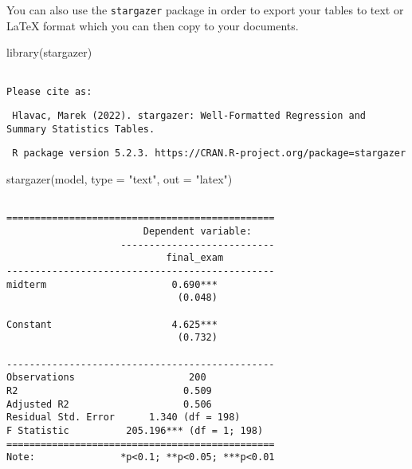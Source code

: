 \documentclass[
  letterpaper,
  DIV=11,
  numbers=noendperiod]{scrreprt}
\newenvironment{Shaded}{\begin{snugshade}}{\end{snugshade}}
\newcommand{\AttributeTok}[1]{\textcolor[rgb]{0.40,0.45,0.13}{#1}}
\newcommand{\FunctionTok}[1]{\textcolor[rgb]{0.28,0.35,0.67}{#1}}
\newcommand{\NormalTok}[1]{\textcolor[rgb]{0.00,0.23,0.31}{#1}}
\newcommand{\StringTok}[1]{\textcolor[rgb]{0.13,0.47,0.30}{#1}}
\begin{document}
You can also use the \texttt{stargazer} package in order to export your
tables to text or LaTeX format which you can then copy to your
documents.

\begin{Shaded}
\begin{Highlighting}[]
\FunctionTok{library}\NormalTok{(stargazer)}
\end{Highlighting}
\end{Shaded}

\begin{verbatim}

Please cite as: 
\end{verbatim}

\begin{verbatim}
 Hlavac, Marek (2022). stargazer: Well-Formatted Regression and Summary Statistics Tables.
\end{verbatim}

\begin{verbatim}
 R package version 5.2.3. https://CRAN.R-project.org/package=stargazer 
\end{verbatim}

\begin{Shaded}
\begin{Highlighting}[]
\FunctionTok{stargazer}\NormalTok{(model, }\AttributeTok{type =} \StringTok{"text"}\NormalTok{, }\AttributeTok{out =} \StringTok{"latex"}\NormalTok{)}
\end{Highlighting}
\end{Shaded}

\begin{verbatim}

===============================================
                        Dependent variable:    
                    ---------------------------
                            final_exam         
-----------------------------------------------
midterm                      0.690***          
                              (0.048)          
                                               
Constant                     4.625***          
                              (0.732)          
                                               
-----------------------------------------------
Observations                    200            
R2                             0.509           
Adjusted R2                    0.506           
Residual Std. Error      1.340 (df = 198)      
F Statistic          205.196*** (df = 1; 198)  
===============================================
Note:               *p<0.1; **p<0.05; ***p<0.01
\end{verbatim}
\end{document}
